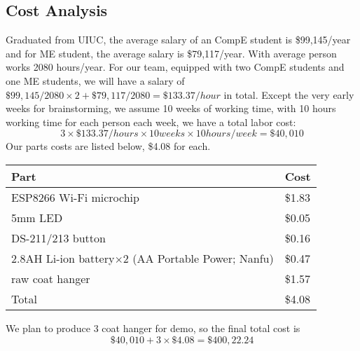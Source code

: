 \subsection{Cost Analysis}
Graduated from UIUC, the average salary of an CompE student is \$99,145/year\cite{salary} and for ME student, the average salary is \$79,117/year\cite{salary-me}. With average person works 2080 hours/year. For our team, equipped with two CompE students and one ME students, we will have a salary of $\$99,145/2080\times2+\$79,117/2080=\$133.37/hour$ in total. Except the very early weeks for brainstorming, we assume 10 weeks of working time, with 10 hours working time for each person each week, we have a total labor cost: $$3\times\$133.37/hours\times10 weeks\times10 hours/week=\$40,010$$
Our parts costs are listed below, \$4.08 for each.  

\begin{table}[h]
    \centering
    \begin{tabularx}{\textwidth}{|X|p{2cm}|}
    \hline
    Part & Cost \\
    \hline
    ESP8266 Wi-Fi microchip & \$1.83 \\
    \hline
    5mm LED & \$0.05 \\
    \hline
    DS-211/213 button & \$0.16 \\
    \hline
    2.8AH Li-ion battery$\times 2$
    (AA Portable Power; Nanfu) & \$0.47 \\
    \hline
    raw coat hanger & \$1.57 \\
    \hline
    Total & \$4.08 \\
    \hline
    \end{tabularx}
\end{table}  


We plan to produce 3 coat hanger for demo, so the final total cost is $$\$40,010+3\times\$4.08=\$400,22.24$$  
\clearpage
